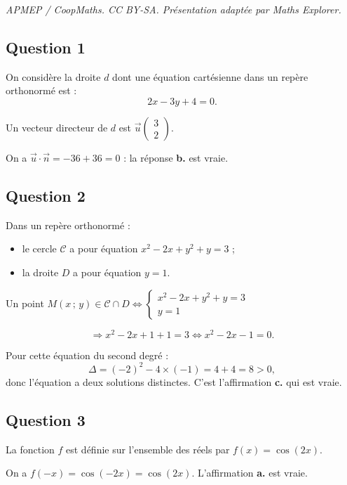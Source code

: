 \documentclass[10pt]{article}
\begin{document}
\noindent\textit{APMEP / CoopMaths. CC BY-SA. Présentation adaptée par Maths Explorer.}\par\medskip
\subsection*{Question 1}

On considère la droite \(d\) dont une équation cartésienne dans un repère orthonormé est :
\[
2x - 3y + 4 = 0.
\]

Un vecteur directeur de \(d\) est \(\vec{u} \begin{pmatrix} 3 \\ 2 \end{pmatrix}\).

On a \(\vec{u} \cdot \overrightarrow{n} = -36 + 36 = 0\) : la réponse \textbf{b.} est vraie.

\subsection*{Question 2}

Dans un repère orthonormé :
\begin{itemize}
    \item le cercle \(\mathcal{C}\) a pour équation \(x^2 - 2x + y^2 + y = 3\) ;
    \item la droite \(D\) a pour équation \(y = 1\).
\end{itemize}

Un point \(M(x\,;\,y) \in \mathcal{C} \cap D \iff \left\{
\begin{array}{l}
x^2 - 2x + y^2 + y = 3 \\
y = 1
\end{array} \right.\)

\[
\Rightarrow x^2 - 2x + 1 + 1 = 3 \iff x^2 - 2x - 1 = 0.
\]

Pour cette équation du second degré :
\[
\Delta = (-2)^2 - 4 \times (-1) = 4 + 4 = 8 > 0,
\]
donc l'équation a deux solutions distinctes. C'est l'affirmation \textbf{c.} qui est vraie.

\subsection*{Question 3}

La fonction \(f\) est définie sur l'ensemble des réels par \(f(x) = \cos(2x)\).

On a \(f(-x) = \cos(-2x) = \cos(2x)\). L'affirmation \textbf{a.} est vraie.
\end{document}
